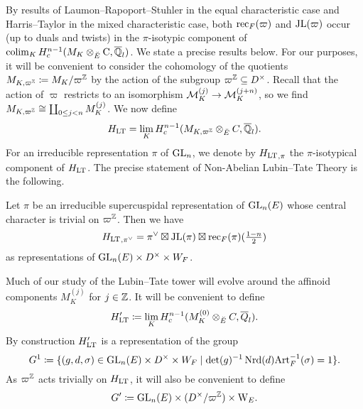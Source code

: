 \documentclass[../main.tex]{subfiles}
\begin{document}
By results of Laumon--Rapoport--Stuhler \cite{laumon1993elliptic} 
in the equal characteristic case and Harris--Taylor \cite{HTShimura} in the 
mixed characteristic case, both $\mathrm{rec}_F(\varpi)$ and $\mathrm{JL}(\varpi)$ occur
(up to duals and twists) in the $\pi$-isotypic component of 
$\operatorname*{colim}_K H^{n-1}_c (M_{K} \otimes_{{\breve {E}}} {\mathrm{C}}, \overline {\mathbb{Q}}_l)$. We state a
precise results below.
For our purposes, it will be convenient to consider the cohomology of the 
quotients $M_{K, \varpi^{\mathbb{Z}}} \coloneqq M_K/\varpi^{\mathbb{Z}}$ by the action of the
subgroup $\varpi^{\mathbb{Z}} \subseteq D^\times$. Recall that the action of 
$\varpi$ restricts to an isomorphism $\mathcal{M}_K^{(j)} \to \mathcal{M}_K^{(j+n)}$, so we find
$M_{K, \varpi^{\mathbb{Z}}} \cong \coprod_{0 \leq j < n} M_{K}^{(j)}$. We now define
\begin{equation} \label{eq:defHLT}
  H_{\mathrm{LT}} = \lim_{K} H^{n-1}_c (M_{K, \varpi^{\mathbb{Z}}} \otimes_{{\breve {E}}} C, \overline {\mathbb{Q}}_l).
\end{equation}
For an irreducible representation $\pi$ of $\operatorname{GL}_n$, we denote by ${H_{\mathrm{LT}}}_{,\pi}$ the 
$\pi$-isotypical component of $H_{\mathrm{LT}}$.
The precise statement of Non-Abelian Lubin--Tate Theory is the following.
\begin{thm}\label{thm:NonAbLTT}
  Let $\pi$ be an irreducible supercuspidal representation of $\operatorname{GL}_n(E)$ whose central
  character is trivial on $\varpi^{\mathbb{Z}}$.   
  Then we have 
  \begin{equation*}
    {H_{\mathrm{LT}}}_{,\pi^\vee} = \pi^\vee \boxtimes \mathrm{JL}(\pi) \boxtimes \mathrm{rec}_F(\pi)(\tfrac{1-n}2)
  \end{equation*}
  as representations of $\operatorname{GL}_n(E) \times D^\times \times W_F$. 
\end{thm}

Much of our study of the Lubin--Tate tower will evolve around
the affinoid components $M_{K}^{(j)}$ for $j \in \mathbb{Z}$. It will be convenient to define 
\begin{equation*}
  H_{\mathrm{LT}}' \coloneqq \lim_K H^{n-1}_c(M_{K}^{(0)} \otimes_{{\breve {E}}} C, \overline Q_l).
\end{equation*}
By construction $H_{\mathrm{LT}}'$ is a representation of the group
\begin{equation}\label{eq:DefGandG1}
  G^1 \coloneqq \{(g,d,\sigma) \in \operatorname{GL}_n(E) \times D^\times \times W_F \mid 
  \det(g)^{-1} \operatorname{Nrd}(d) \mathrm{Art}_F^{-1}(\sigma) = 1\}.
\end{equation}
As $\varpi^{\mathbb{Z}}$ acts trivially on $H_{\mathrm{LT}}$, it will also be convenient to define
\begin{equation*}
  G' \coloneqq \operatorname{GL}_n(E) \times (D^\times/\varpi^{\mathbb{Z}}) \times \mathrm W_E.
\end{equation*}
\end{document}
